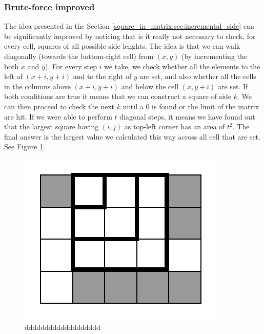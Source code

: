 \subsubsection{Brute-force improved}
The idea presented in the Section \ref{square_in_matrix:sec:incremental_side}
can be significantly improved by noticing that is it really not necessary to
check, for every cell, squares of all possible side lenghts.
The idea is that we can walk diagonally (towards the bottom-right cell)
from $(x,y)$ (by incrementing the both $x$ and $y$). For every step $i$ we take,
we check whether all the elements to the left of $(x+i, y+i)$  and to the
right of  $y$ are set, and also whether all the cells in the columns above
$(x+i, y+i)$ and below the cell $(x,y+i)$ are set. If both conditions are true
it means that we can construct a square of side $k$. We can then proceed to
check the next $k$ until a $0$ is found or the limit of the matrix are hit. If
we were able to perform $t$ diagonal steps,
it means we have found out that the largest square having $(i,j)$ as top-left
corner has an area of $t^2$. The final answer is the largest value we calculated
this way across all cell that are set. See Figure \ref{fig:square_in_matrix:squa_matrix_incremental}.


\begin{figure}
	\centering
	\label{fig:square_in_matrix:squa_matrix_incremental}
	\includegraphics[width=\textwidth/2]{sources/square_in_matrix/images/squa_matrix_incremental}
	\caption{ddddddddddddddddddd }
\end{figure}

